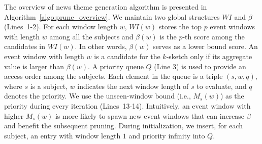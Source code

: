 
The overview of news theme generation algorithm is presented in Algorithm~\ref{algo:prune_overview}. We maintain two global structures $WI$ and $\beta$ (Lines~1-2). For each window length $w$, $WI(w)$ stores the top $p$ event windows with length $w$ among all the subjects and $\beta(w)$ is the $p$-th score among the candidates in $WI(w)$. 
In other words, $\beta(w)$ serves as a lower bound score. An event window with length $w$ is a candidate for the $k$-sketch only if its aggregate value is larger than $\beta(w)$. A priority queue $Q$ (Line 3) is used to provide an access order among the subjects. Each element in the queue is a triple $(s,w,q)$, where $s$ is a subject, $w$ indicates the next window length of $s$ to evaluate, and $q$ denotes the priority. We use the unseen-window bound (i.e., $M_s(w)$) as the priority during every iteration (Lines~13-14). Intuitively, an event window with higher $M_s(w)$ is more likely to spawn new event windows that can increase $\beta$ and benefit the subsequent pruning. During initialization, we insert, for each subject, an entry with window length $1$ and priority infinity into $Q$.




